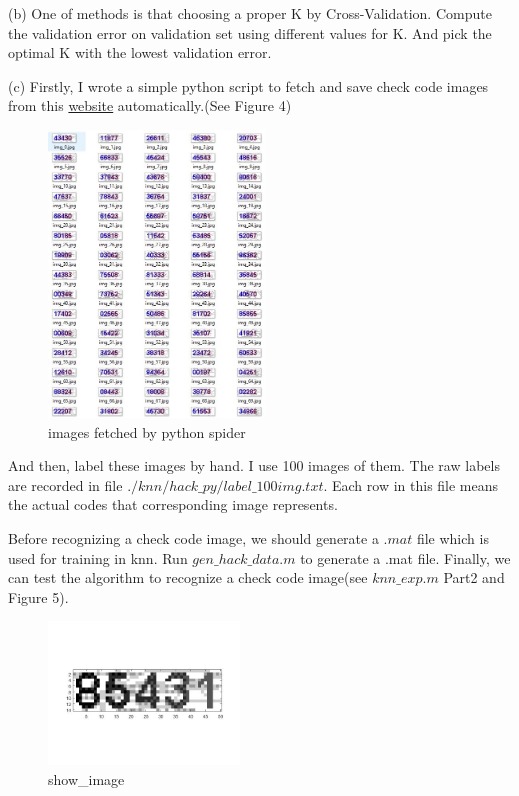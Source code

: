 \documentclass[11pt]{article} %
\begin{document}
(b) 
One of methods is that choosing a proper K by Cross-Validation. Compute the validation error on validation set using different values for K. And pick the optimal K with the lowest validation error.

(c)
Firstly, I wrote a simple python script to fetch and save check code images from this \href{http://jwbinfosys.zju.edu.cn/default2.aspx}{website} automatically.(See Figure 4)

\begin{figure}
\centering
\includegraphics[height=3in]{knn_spider.jpg}  %
\caption{images fetched by python spider}
\label{fig4}
\end{figure}

And then, label these images by hand. I use 100 images of them. The raw labels are recorded in file  $./knn/hack\_py/label\_100img.txt$. Each row in this file means the actual codes that corresponding image represents.

Before recognizing a check code image, we should generate a $.mat$ file which is used for training in knn. Run $gen\_hack\_data.m$ to generate a .mat file.
Finally, we can test the algorithm to recognize a check code image(see $knn\_exp.m$ Part2 and Figure 5).

\begin{figure}
\centering
\includegraphics[width=2in]{knn_showimg.jpg}  %
\caption{show\_image}
\label{fig5}
\end{figure}
\end{document}
